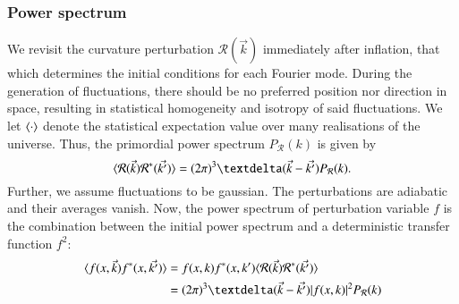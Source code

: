 










\subsubsection{Power spectrum}\label{mil4:theo:sec:power_spectrum}
    We revisit the curvature perturbation $\mathcal{R}(\vec{k})$ immediately after inflation, that which determines the initial conditions for each Fourier mode. During the generation of fluctuations, there should be no preferred position nor direction in space, resulting in statistical homogeneity and isotropy of said fluctuations. We let $\langle \cdot \rangle$ denote the statistical expectation value over many realisations of the universe. Thus, the primordial power spectrum $P_\mathcal{R}(k)$ is given by
    \begin{equation}
        \avg{\mathcal{R}(\vec{k})\mathcal{R}^*(\vec{k'})} = (2\pi)^3 \deltafunc{\vec{k}-\vec{k'}}P_\mathcal{R}(k).
    \end{equation}
    Further, we assume fluctuations to be gaussian. The perturbations are adiabatic and their averages vanish. Now, the power spectrum of perturbation variable $f$ is the combination between the initial power spectrum and a deterministic transfer function $f^2$:
    \begin{equation}\label{mil4:theo:eq:defining_power_spectrum}
    \begin{split}
        \avg{f(x,\vec{k}) f^\ast(x,\vec{k'})} &= f(x,k)f^\ast(x,k') \avg{\mathcal{R}(\vec{k})\mathcal{R}^*(\vec{k'})} \\
        &= (2\pi)^3 \deltafunc{\vec{k}-\vec{k'}} \abs{f(x,k)}^2 P_\mathcal{R}(k)
    \end{split}
    \end{equation}


